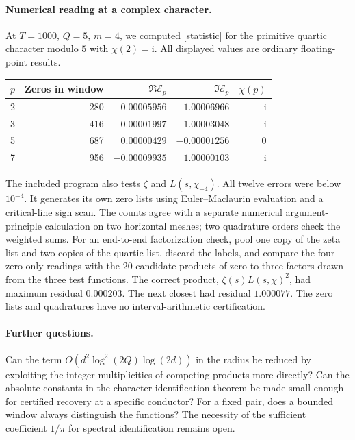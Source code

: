 \documentclass[11pt]{article}
\newcommand{\ii}{\mathrm i}
\begin{document}
\paragraph{Numerical reading at a complex character.}
At $T=1000$, $Q=5$, $m=4$, we computed \eqref{statistic} for the primitive quartic character modulo $5$ with $\chi(2)=\ii$. All displayed values are ordinary floating-point results.
\begin{center}
\begin{tabular}{rrrrr}
\toprule
$p$ & Zeros in window & $\Re\mathcal E_p$ & $\Im\mathcal E_p$ & $\chi(p)$\\
\midrule
2&280& $0.00005956$& $1.00006966$& $\ii$\\
3&416& $-0.00001997$& $-1.00003048$& $-\ii$\\
5&687& $0.00000429$& $-0.00001256$& $0$\\
7&956& $-0.00009935$& $1.00000103$& $\ii$\\
\bottomrule
\end{tabular}
\end{center}
The included program also tests $\zeta$ and $L(s,\chi_{-4})$. All twelve errors were below $10^{-4}$. It generates its own zero lists using Euler--Maclaurin evaluation and a critical-line sign scan. The counts agree with a separate numerical argument-principle calculation on two horizontal meshes; two quadrature orders check the weighted sums. For an end-to-end factorization check, pool one copy of the zeta list and two copies of the quartic list, discard the labels, and compare the four zero-only readings with the $20$ candidate products of zero to three factors drawn from the three test functions. The correct product, $\zeta(s)L(s,\chi)^2$, had maximum residual $0.000203$. The next closest had residual $1.000077$. The zero lists and quadratures have no interval-arithmetic certification.

\paragraph{Further questions.}
Can the term $O(d^2\log^2(2Q)\log(2d))$ in the radius be reduced by exploiting the integer multiplicities of competing products more directly? Can the absolute constants in the character identification theorem be made small enough for certified recovery at a specific conductor? For a fixed pair, does a bounded window always distinguish the functions? The necessity of the sufficient coefficient $1/\pi$ for spectral identification remains open.
\end{document}
